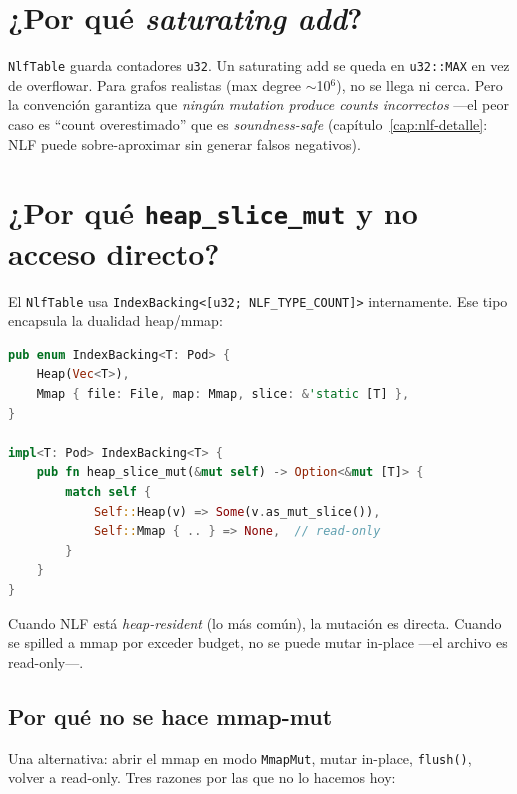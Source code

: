 \section{¿Por qué \emph{saturating add}?}

\texttt{NlfTable} guarda contadores \texttt{u32}. Un saturating add
se queda en \texttt{u32::MAX} en vez de overflowar. Para grafos
realistas (max degree $\sim$10\(^6\)), no se llega ni cerca.
Pero la convención garantiza que \emph{ningún mutation produce
counts incorrectos} ---el peor caso es ``count overestimado'' que
es \emph{soundness-safe} (capítulo~\ref{cap:nlf-detalle}: NLF puede
sobre-aproximar sin generar falsos negativos).

\section{¿Por qué \texttt{heap\_slice\_mut} y no acceso directo?}

El \texttt{NlfTable} usa \texttt{IndexBacking<[u32; NLF\_TYPE\_COUNT]>}
internamente. Ese tipo encapsula la dualidad heap/mmap:

\begin{lstlisting}[language=Rust]
pub enum IndexBacking<T: Pod> {
    Heap(Vec<T>),
    Mmap { file: File, map: Mmap, slice: &'static [T] },
}

impl<T: Pod> IndexBacking<T> {
    pub fn heap_slice_mut(&mut self) -> Option<&mut [T]> {
        match self {
            Self::Heap(v) => Some(v.as_mut_slice()),
            Self::Mmap { .. } => None,  // read-only
        }
    }
}
\end{lstlisting}

\noindent
Cuando NLF está \emph{heap-resident} (lo más común), la mutación es
directa. Cuando se spilled a mmap por exceder budget, no se puede
mutar in-place ---el archivo es read-only---.

\subsection{Por qué no se hace mmap-mut}

Una alternativa: abrir el mmap en modo \texttt{MmapMut}, mutar in-place,
\texttt{flush()}, volver a read-only. Tres razones por las que no
lo hacemos hoy:

